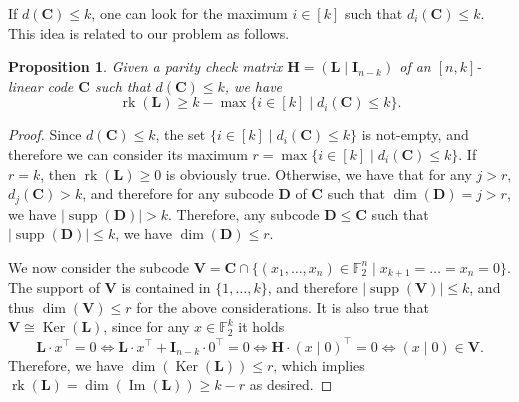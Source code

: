 \documentclass[11pt]{article}
\newcommand{\F}[0]{\mathbb{F}}
\theoremstyle{plain}
\newtheorem{prop}[theo]{Proposition}
\theoremstyle{definition}
\theoremstyle{remark}
\begin{document}
If $d(\mathbf{C})\leq k$, one can look for the maximum $i\in[k]$ such that $d_i(\mathbf{C})\leq k$. This idea is related to our problem as follows.
\begin{prop}
    Given a parity check matrix $\mathbf{H}=(\mathbf{L}\mid \mathbf{I}_{n-k})$ of an $[n,k]$-linear code $\mathbf{C}$ such that $d(\mathbf{C})\leq k$, we have 
    \begin{equation*}
        \operatorname{rk}(\mathbf{L})\geq k-\max\{i\in[k]\mid d_i(\mathbf{C})\leq k\}.
    \end{equation*}
\end{prop}
\begin{proof}
    Since $d(\mathbf{C})\leq k$, the set $\{i\in[k]\mid d_i(\mathbf{C})\leq k\}$ is not-empty, and therefore we can consider its maximum $r=\max\{i\in[k]\mid d_i(\mathbf{C})\leq k\}$. If $r=k$, then $\operatorname{rk}(\mathbf{L})\geq 0$ is obviously true. Otherwise, we have that for any $j>r$, $d_j(\mathbf{C})>k$, and therefore for any subcode $\mathbf{D}$ of $\mathbf{C}$ such that $\operatorname{dim}(\mathbf{D})=j>r$, we have $|\operatorname{supp}(\mathbf{D})|>k$. Therefore, any subcode $\mathbf{D}\leq\mathbf{C}$ such that $|\operatorname{supp}(\mathbf{D})|\leq k$, we have $\operatorname{dim}(\mathbf{D})\leq r$.
    
    We now consider the subcode $\mathbf{V}=\mathbf{C}\cap\{(x_1,\dots,x_n)\in\F_2^n\mid x_{k+1}=\ldots=x_n=0\}$. The support of $\mathbf{V}$ is contained in $\{1,\dots,k\}$, and therefore $|\operatorname{supp}(\mathbf{V})|\leq k$, and thus $\operatorname{dim}(\mathbf{V})\leq r$ for the above considerations. It is also true that $\mathbf{V}\cong\operatorname{Ker}(\mathbf{L})$, since for any $x\in\F_2^k$ it holds
    \begin{equation*}
        \mathbf{L}\cdot x^\top=0\iff \mathbf{L}\cdot x^\top+\mathbf{I}_{n-k}\cdot0^\top=0\iff\mathbf{H}\cdot(x\mid 0)^\top=0\iff(x\mid 0)\in\mathbf{V}.
    \end{equation*}
    Therefore, we have $\operatorname{dim}(\operatorname{Ker}(\mathbf{L}))\leq r$, which implies $\operatorname{rk}(\mathbf{L})=\operatorname{dim}(\operatorname{Im}(\mathbf{L}))\geq k-r$ as desired.
    
\end{proof}
\end{document}
